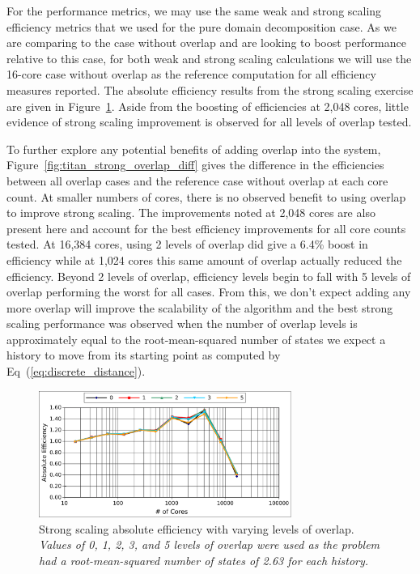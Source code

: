 \documentclass{snamc2013}
\begin{document}
For the performance metrics, we may use the same weak and strong
scaling efficiency metrics that we used for the pure domain
decomposition case. As we are comparing to the case without overlap
and are looking to boost performance relative to this case, for both
weak and strong scaling calculations we will use the 16-core case
without overlap as the reference computation for all efficiency
measures reported. The absolute efficiency results from the strong
scaling exercise are given in
Figure~\ref{fig:titan_strong_overlap}. Aside from the boosting of
efficiencies at 2,048 cores, little evidence of strong scaling
improvement is observed for all levels of overlap tested.

To further explore any potential benefits of adding overlap into the
system, Figure~\ref{fig:titan_strong_overlap_diff} gives the
difference in the efficiencies between all overlap cases and the
reference case without overlap at each core count. At smaller numbers
of cores, there is no observed benefit to using overlap to improve
strong scaling. The improvements noted at 2,048 cores are also present
here and account for the best efficiency improvements for all core
counts tested. At 16,384 cores, using 2 levels of overlap did give a
6.4\% boost in efficiency while at 1,024 cores this same amount of
overlap actually reduced the efficiency. Beyond 2 levels of overlap,
efficiency levels begin to fall with 5 levels of overlap performing
the worst for all cases. From this, we don't expect adding any more
overlap will improve the scalability of the algorithm and the best
strong scaling performance was observed when the number of overlap
levels is approximately equal to the root-mean-squared number of
states we expect a history to move from its starting point as computed
by Eq~(\ref{eq:discrete_distance}).

\begin{figure}[h!]
  \begin{center}
    \includegraphics[width=3.25in]{titan_strong_overlap.pdf}
  \end{center}
  \caption{Strong scaling absolute efficiency with varying levels of
    overlap. \textit{Values of 0, 1, 2, 3, and 5 levels of overlap
      were used as the problem had a root-mean-squared number of
      states of 2.63 for each history.}}
  \label{fig:titan_strong_overlap}
\end{figure}
\end{document}
